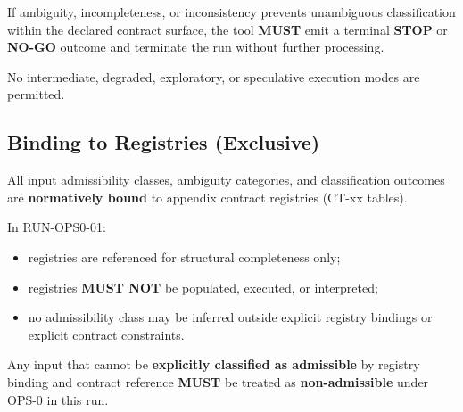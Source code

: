 If ambiguity, incompleteness, or inconsistency prevents unambiguous classification
within the declared contract surface,
the tool \textbf{MUST} emit a terminal \textbf{STOP} or \textbf{NO-GO} outcome
and terminate the run without further processing.

No intermediate, degraded, exploratory,
or speculative execution modes are permitted.

\subsection{Binding to Registries (Exclusive)}
All input admissibility classes, ambiguity categories, and classification outcomes
are \textbf{normatively bound} to appendix contract registries (CT-xx tables).

In RUN-OPS0-01:
\begin{itemize}
  \item registries are referenced for structural completeness only;
  \item registries \textbf{MUST NOT} be populated, executed, or interpreted;
  \item no admissibility class may be inferred
        outside explicit registry bindings
        or explicit contract constraints.
\end{itemize}

Any input that cannot be
\textbf{explicitly classified as admissible}
by registry binding and contract reference
\textbf{MUST} be treated as \textbf{non-admissible}
under OPS-0 in this run.
